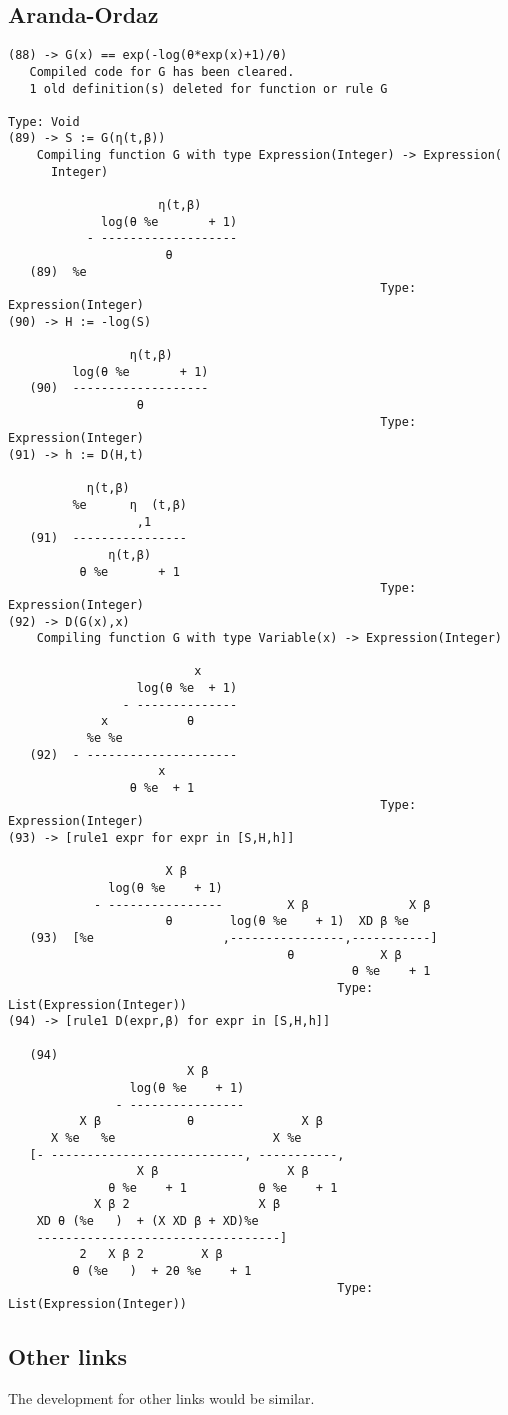 \documentclass[11pt]{article}
\begin{document}
\subsection{Aranda-Ordaz}
\label{sec:orgheadline6}
\begin{verbatim}
(88) -> G(x) == exp(-log(θ*exp(x)+1)/θ)
   Compiled code for G has been cleared.
   1 old definition(s) deleted for function or rule G 
                                                                   Type: Void
(89) -> S := G(η(t,β))
    Compiling function G with type Expression(Integer) -> Expression(
      Integer) 

                     η(t,β)
             log(θ %e       + 1)
           - -------------------
                      θ
   (89)  %e
                                                    Type: Expression(Integer)
(90) -> H := -log(S)
 
                 η(t,β)
         log(θ %e       + 1)
   (90)  -------------------
                  θ
                                                    Type: Expression(Integer)
(91) -> h := D(H,t)
 
           η(t,β)
         %e      η  (t,β)
                  ,1
   (91)  ----------------
              η(t,β)
          θ %e       + 1
                                                    Type: Expression(Integer)
(92) -> D(G(x),x)
    Compiling function G with type Variable(x) -> Expression(Integer) 

                          x
                  log(θ %e  + 1)
                - --------------
             x           θ
           %e %e
   (92)  - ---------------------
                     x
                 θ %e  + 1
                                                    Type: Expression(Integer)
(93) -> [rule1 expr for expr in [S,H,h]]
 
                      X β
              log(θ %e    + 1)
            - ----------------         X β              X β
                      θ        log(θ %e    + 1)  XD β %e
   (93)  [%e                  ,----------------,-----------]
                                       θ            X β
                                                θ %e    + 1
                                              Type: List(Expression(Integer))
(94) -> [rule1 D(expr,β) for expr in [S,H,h]]
 
   (94)
                         X β
                 log(θ %e    + 1)
               - ----------------
          X β            θ               X β
      X %e   %e                      X %e
   [- ---------------------------, -----------,
                  X β                  X β
              θ %e    + 1          θ %e    + 1
            X β 2                  X β
    XD θ (%e   )  + (X XD β + XD)%e
    ----------------------------------]
          2   X β 2        X β
         θ (%e   )  + 2θ %e    + 1
                                              Type: List(Expression(Integer))
\end{verbatim}

\subsection{Other links}
\label{sec:orgheadline7}

The development for other links would be similar.
\end{document}
